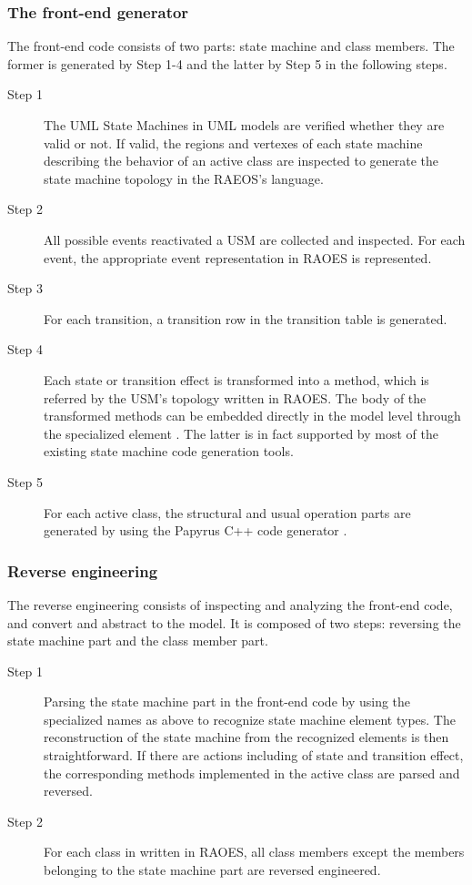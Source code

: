 \noindent
\subsubsection{The front-end generator}
\label{subsubsec:gen}
The front-end code consists of two parts: state machine and class members.
The former is generated by Step 1-4 and the latter by Step 5 in the following steps.
\begin{description}
	\item[Step 1] The UML State Machines in UML models are verified whether they are valid or not. 
	If valid, the regions and vertexes of each state machine describing the behavior of an active class are inspected to generate the state machine topology in the RAEOS's language. 
	\item[Step 2] All possible events reactivated a USM are collected and inspected. 
	For each event, the appropriate event representation in RAOES is represented.
	
	\item[Step 3] For each transition, a transition row in the transition table is generated.
	
	\item[Step 4] Each state  or transition effect is transformed into a method, which is referred by the USM's topology written in RAOES. 
	The body of the transformed methods can be embedded directly in the model level through the specialized element . 
	The latter is in fact supported by most of the existing state machine code generation tools.
	
	\item[Step 5] For each active class, the structural and usual operation parts are generated by using the Papyrus C++ code generator \cite{_papyrus/designer/code-generation_????}. 
\end{description}

\noindent
\subsubsection{Reverse engineering}
\label{subsubsec:reverse}
The reverse engineering consists of inspecting and analyzing the front-end code, and convert and abstract to the model. 
It is composed of two steps: reversing the state machine part and the class member part.

\begin{description}
	\item[Step 1] Parsing the state machine part in the front-end code by using the specialized names as above to recognize state machine element types.
	The reconstruction of the state machine from the recognized elements is then straightforward.
	If there are actions including  of state and transition effect, the corresponding methods implemented in the active class are parsed and reversed.
	
	\item[Step 2] For each class in written in RAOES, all class members except the members belonging to the state machine part are reversed engineered.
\end{description}

